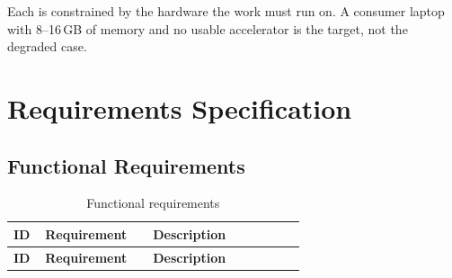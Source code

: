 \documentclass[12pt,a4paper]{report}
\begin{document}
Each is constrained by the hardware the work must run on. A consumer laptop
with 8--16\,GB of memory and no usable accelerator is the target, not the
degraded case.

\section{Requirements Specification}

\subsection{Functional Requirements}

\begin{longtable}{@{}p{0.10\linewidth}p{0.34\linewidth}p{0.48\linewidth}@{}}
\caption{Functional requirements}\label{tab:fr}\\
\toprule
\textbf{ID} & \textbf{Requirement} & \textbf{Description} \\
\midrule
\endfirsthead
\toprule
\textbf{ID} & \textbf{Requirement} & \textbf{Description} \\
\midrule
\endhead


\end{longtable}
\end{document}
